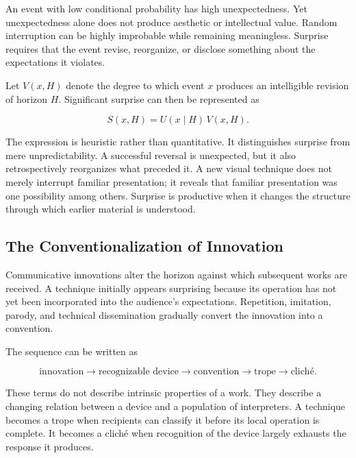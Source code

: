 \documentclass[11pt]{article}
\begin{document}
An event with low conditional probability has high unexpectedness. Yet
unexpectedness alone does not produce aesthetic or intellectual value.
Random interruption can be highly improbable while remaining meaningless.
Surprise requires that the event revise, reorganize, or disclose something
about the expectations it violates.

Let \(V(x,H)\) denote the degree to which event \(x\) produces an intelligible
revision of horizon \(H\). Significant surprise can then be represented as

\begin{equation}
  S(x,H)=U(x\mid H)\,V(x,H).
  \label{eq:significant-surprise}
\end{equation}

The expression is heuristic rather than quantitative. It distinguishes
surprise from mere unpredictability. A successful reversal is unexpected, but
it also retrospectively reorganizes what preceded it. A new visual technique
does not merely interrupt familiar presentation; it reveals that familiar
presentation was one possibility among others. Surprise is productive when it
changes the structure through which earlier material is understood.

\subsection{The Conventionalization of Innovation}

Communicative innovations alter the horizon against which subsequent works
are received. A technique initially appears surprising because its operation
has not yet been incorporated into the audience's expectations. Repetition,
imitation, parody, and technical dissemination gradually convert the
innovation into a convention.

The sequence can be written as

\begin{equation}
  \text{innovation}
  \longrightarrow
  \text{recognizable device}
  \longrightarrow
  \text{convention}
  \longrightarrow
  \text{trope}
  \longrightarrow
  \text{cliché}.
  \label{eq:innovation-cliche}
\end{equation}

These terms do not describe intrinsic properties of a work. They describe a
changing relation between a device and a population of interpreters. A
technique becomes a trope when recipients can classify it before its local
operation is complete. It becomes a cliché when recognition of the device
largely exhausts the response it produces.
\end{document}
